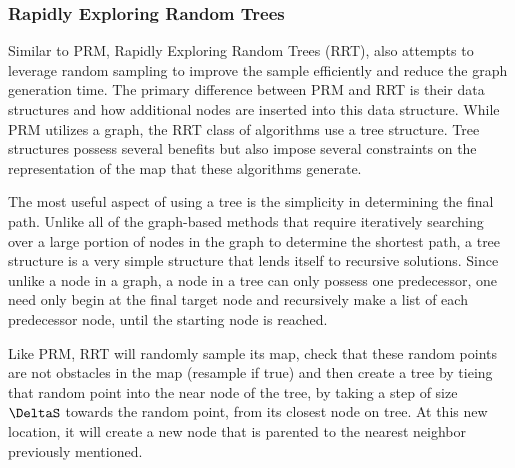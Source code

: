 \subsubsection{Rapidly Exploring Random Trees}

Similar to PRM, Rapidly Exploring Random Trees (RRT), also attempts to leverage random sampling to improve the sample efficiently and reduce the graph generation time. The primary difference between PRM and RRT is their data structures and how additional nodes are inserted into this data structure. While PRM utilizes a graph, the RRT class of algorithms use a tree structure. Tree structures possess several benefits but also impose several constraints on the representation of the map that these algorithms generate. 

The most useful aspect of using a tree is the simplicity in determining the final path. Unlike all of the graph-based methods that require iteratively searching over a large portion of nodes in the graph to determine the shortest path, a tree structure is a very simple structure that lends itself to recursive solutions. Since unlike a node in a graph, a node in a tree can only possess one predecessor, one need only begin at the final target node and recursively make a list of each predecessor node, until the starting node is reached.

Like PRM, RRT will randomly sample its map, check that these random points are not obstacles in the map (resample if true) and then create a tree by tieing that random point into the near node of the tree, by taking a step of size $\DeltaS$ towards the random point, from its closest node on tree. At this new location, it will create a new node that is parented to the nearest neighbor previously mentioned. 



